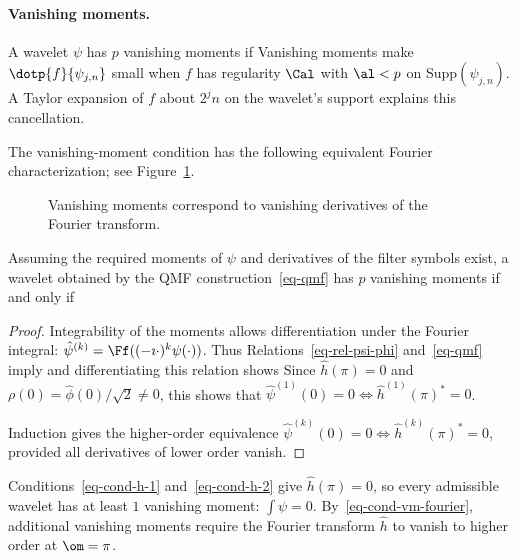   
\paragraph{Vanishing moments.}

A wavelet $\psi$ has $p$ vanishing moments if
Vanishing moments make $\dotp{f}{\psi_{j,n}}$ small when $f$ has regularity $\Cal$ with $\al<p$ on Supp$(\psi_{j,n})$. A Taylor expansion of $f$ about $2^j n$ on the wavelet's support explains this cancellation.
 
The vanishing-moment condition has the following equivalent Fourier characterization; see Figure~\ref{fig-vanmoments}.

\begin{figure}[tbp]
\centering
{}
\caption{Vanishing moments correspond to vanishing derivatives of the Fourier transform.}
\label{fig-vanmoments}
\end{figure}

\begin{prop}
Assuming the required moments of $\psi$ and derivatives of the filter symbols exist, a wavelet obtained by the QMF construction~\eqref{eq-qmf} has $p$ vanishing moments if and only if
\end{prop}
\begin{proof}
	Integrability of the moments allows differentiation under the Fourier integral: $\hat\psi^{(k)} = \Ff( (-\imath \cdot)^k \psi(\cdot) )$. Thus
	Relations~\eqref{eq-rel-psi-phi} and~\eqref{eq-qmf} imply
	and differentiating this relation shows	
	Since $\hat h(\pi)=0$ and $\rho(0)=\hat\phi(0)/\sqrt2\neq0$, this shows that $\hat\psi^{(1)}(0)=0 \Leftrightarrow \hat h^{(1)}(\pi)^*=0$.
	 
	Induction gives the higher-order equivalence
	$\hat\psi^{(k)}(0)=0 \Leftrightarrow \hat h^{(k)}(\pi)^*=0$, provided all derivatives of lower order vanish.
\end{proof}

Conditions~\eqref{eq-cond-h-1} and~\eqref{eq-cond-h-2} give $\hat h(\pi)=0$, so every admissible wavelet has at least $1$ vanishing moment: $\int \psi=0$. By~\eqref{eq-cond-vm-fourier}, additional vanishing moments require the Fourier transform $\hat h$ to vanish to higher order at $\om=\pi$.

